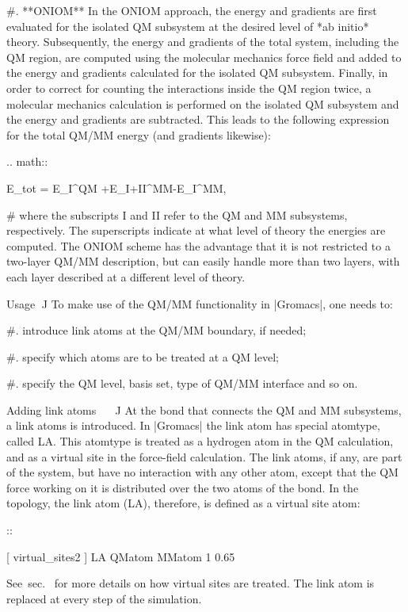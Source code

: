 #. **ONIOM** In the ONIOM approach, the energy and gradients are first
   evaluated for the isolated QM subsystem at the desired level of *ab
   initio* theory. Subsequently, the energy and gradients of the total
   system, including the QM region, are computed using the molecular
   mechanics force field and added to the energy and gradients
   calculated for the isolated QM subsystem. Finally, in order to
   correct for counting the interactions inside the QM region twice, a
   molecular mechanics calculation is performed on the isolated QM
   subsystem and the energy and gradients are subtracted. This leads to
   the following expression for the total QM/MM energy (and gradients
   likewise):

   .. math::

      E_{tot} = E_{I}^{QM}
      +E_{I+II}^{MM}-E_{I}^{MM},

#  where the subscripts I and II refer to the QM and MM subsystems,
   respectively. The superscripts indicate at what level of theory the
   energies are computed. The ONIOM scheme has the advantage that it is
   not restricted to a two-layer QM/MM description, but can easily
   handle more than two layers, with each layer described at a different
   level of theory.

Usage
^^^^^

To make use of the QM/MM functionality in |Gromacs|, one needs to:

#. introduce link atoms at the QM/MM boundary, if needed;

#. specify which atoms are to be treated at a QM level;

#. specify the QM level, basis set, type of QM/MM interface and so on.

Adding link atoms
^^^^^^^^^^^^^^^^^

At the bond that connects the QM and MM subsystems, a link atoms is
introduced. In |Gromacs| the link atom has special atomtype, called LA.
This atomtype is treated as a hydrogen atom in the QM calculation, and
as a virtual site in the force-field calculation. The link atoms, if
any, are part of the system, but have no interaction with any other
atom, except that the QM force working on it is distributed over the two
atoms of the bond. In the topology, the link atom (LA), therefore, is
defined as a virtual site atom:

::

    [ virtual_sites2 ]
    LA QMatom MMatom 1 0.65

See sec. 
for more details on how virtual
sites are treated. The link atom is replaced at every step of the
simulation.

